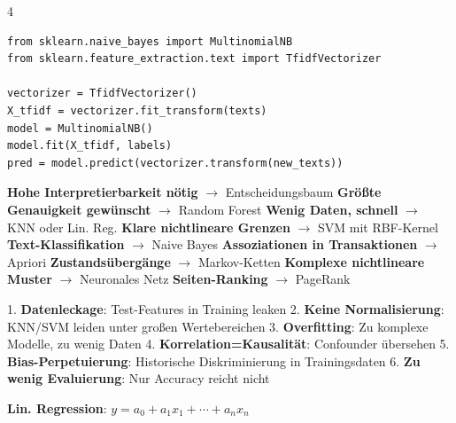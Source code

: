 \begin{landscape}
\begin{multicols*}{4}

		\begin{cheatSheetBox}[title=Naive Bayes Classifier]
			\begin{lstlisting}
from sklearn.naive_bayes import MultinomialNB
from sklearn.feature_extraction.text import TfidfVectorizer

vectorizer = TfidfVectorizer()
X_tfidf = vectorizer.fit_transform(texts)
model = MultinomialNB()
model.fit(X_tfidf, labels)
pred = model.predict(vectorizer.transform(new_texts))
			\end{lstlisting}
		\end{cheatSheetBox}


		\begin{cheatSheetBox}[title=Algorithmus-Wahl nach Szenario]
			\textbf{Hohe Interpretierbarkeit nötig} $\rightarrow$ Entscheidungsbaum
			\textbf{Größte Genauigkeit gewünscht} $\rightarrow$ Random Forest
			\textbf{Wenig Daten, schnell} $\rightarrow$ KNN oder Lin. Reg.
			\textbf{Klare nichtlineare Grenzen} $\rightarrow$ SVM mit RBF-Kernel
			\textbf{Text-Klassifikation} $\rightarrow$ Naive Bayes
			\textbf{Assoziationen in Transaktionen} $\rightarrow$ Apriori
			\textbf{Zustandsübergänge} $\rightarrow$ Markov-Ketten
			\textbf{Komplexe nichtlineare Muster} $\rightarrow$ Neuronales Netz
			\textbf{Seiten-Ranking} $\rightarrow$ PageRank
		\end{cheatSheetBox}


		\begin{cheatSheetBox}[title=Fehler]
			1. \textbf{Datenleckage}: Test-Features in Training leaken
			2. \textbf{Keine Normalisierung}: KNN/SVM leiden unter großen Wertebereichen
			3. \textbf{Overfitting}: Zu komplexe Modelle, zu wenig Daten
			4. \textbf{Korrelation=Kausalität}: Confounder übersehen
			5. \textbf{Bias-Perpetuierung}: Historische Diskriminierung in Trainingsdaten
			6. \textbf{Zu wenig Evaluierung}: Nur Accuracy reicht nicht
		\end{cheatSheetBox}


		\begin{cheatSheetBox}[title=Zentrale Formeln]
			\textbf{Lin. Regression}:
			$y = a_0 + a_1x_1 + \cdots + a_nx_n$


\end{cheatSheetBox}
\end{multicols*}
\end{landscape}
